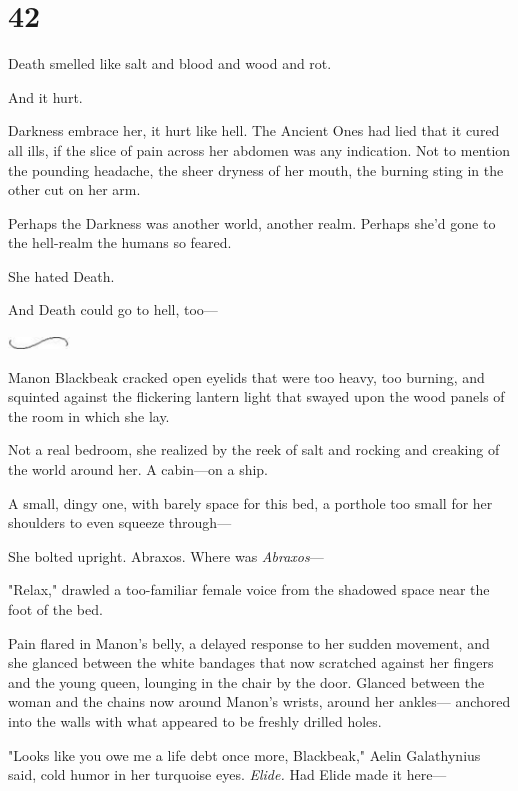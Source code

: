
\chapter{42}

Death smelled like salt and blood and wood and rot.

And it hurt.

Darkness embrace her, it hurt like hell.
The Ancient Ones had lied that it cured all ills, if the slice of pain across her abdomen was any indication.
Not to mention the pounding headache, the sheer dryness of her mouth, the burning sting in the other cut on her arm.

Perhaps the Darkness was another world, another realm.
Perhaps she'd gone to the hell-realm the humans so feared.

She hated Death.

And Death could go to hell, too---

\begin{center}
	\includegraphics[width=0.65in,height=0.13in]{images/seperator}
\end{center}

Manon Blackbeak cracked open eyelids that were too heavy, too burning, and squinted against the flickering lantern light that swayed upon the wood panels of the room in which she lay.

Not a real bedroom, she realized by the reek of salt and rocking and creaking of the world around her.
A cabin---on a ship.

A small, dingy one, with barely space for this bed, a porthole too small for her shoulders to even squeeze through---

She bolted upright.
Abraxos.
Where was \emph{Abraxos}---

"Relax," drawled a too-familiar female voice from the shadowed space near the foot of the bed.

Pain flared in Manon's belly, a delayed response to her sudden movement, and she glanced between the white bandages that now scratched against her fingers and the young queen, lounging in the chair by the door.
Glanced between the woman and the chains now around Manon's wrists, around her ankles--- anchored into the walls with what appeared to be freshly drilled holes.

"Looks like you owe me a life debt once more, Blackbeak," Aelin Galathynius said, cold humor in her turquoise eyes.
\emph{Elide.} Had Elide made it here---

